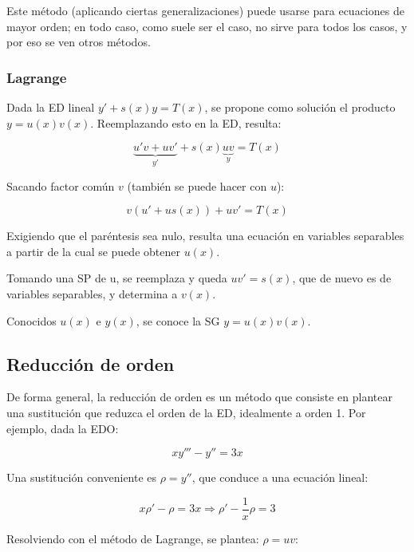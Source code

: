 \documentclass{article}
\begin{document}
Este método (aplicando ciertas generalizaciones) puede usarse para ecuaciones de mayor orden; en todo caso, como suele ser el caso, no sirve para todos los casos, y por eso se ven otros métodos.

\subsubsection{Lagrange}

Dada la ED lineal $y' + s(x) y = T(x)$, se propone como solución el producto $y = u(x) v(x)$. Reemplazando esto en la ED, resulta:

\begin{equation}
\underbrace{u'v + uv'}_{y'} + s(x) \underbrace{uv}_{y} = T(x)
\end{equation}

Sacando factor común $v$ (también se puede hacer con $u$):

\begin{equation}
v (u' + u s(x)) + uv' = T(x)
\end{equation}

Exigiendo que el paréntesis sea nulo, resulta una ecuación en variables separables a partir de la cual se puede obtener $u(x)$.

Tomando una SP de u, se reemplaza y queda $uv' = s(x)$, que de nuevo es de variables separables, y determina a $v(x)$.

Conocidos $u(x)$ e $y(x)$, se conoce la SG $y = u(x) v(x)$.

\subsection{Reducción de orden}

De forma general, la reducción de orden es un método que consiste en plantear una sustitución que reduzca el orden de la ED, idealmente a orden 1. Por ejemplo, dada la EDO:

\begin{equation}
xy''' - y'' = 3x
\end{equation}

Una sustitución conveniente es $\rho = y''$, que conduce a una ecuación lineal:

\begin{equation}
x \rho' - \rho = 3x \Rightarrow \rho' - \frac{1}{x} \rho = 3
\end{equation}

Resolviendo con el método de Lagrange, se plantea: $\rho = u v$:
\end{document}
